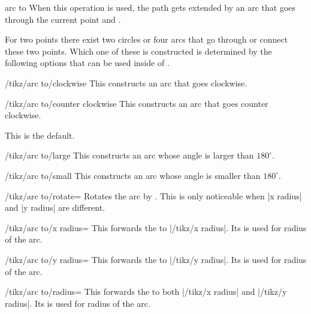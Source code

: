 \begin{pathoperation}{arc to}{}
When this operation is used, the path gets extended by an arc that goes through
the current point and .

For two points there exist two circles or four arcs that go through or connect
these two points. Which one of these is constructed is determined by the following
options that can be used inside of .

\begin{stylekey}{/tikz/arc to/clockwise}
  This constructs an arc that goes clockwise.
\end{stylekey}

\begin{stylekey}{/tikz/arc to/counter clockwise}
  This constructs an arc that goes counter clockwise.
  
  This is the default.
\end{stylekey}

\begin{stylekey}{/tikz/arc to/large}
  This constructs an arc whose angle is larger than $180^\circ$.
\end{stylekey}

\begin{stylekey}{/tikz/arc to/small}
  This constructs an arc whose angle is smaller than $180^\circ$.
\end{stylekey}

\begin{key}{/tikz/arc to/rotate=}
  Rotates the arc by .
  This is only noticeable when |x radius| and |y radius| are different.
\end{key}

\begin{key}{/tikz/arc to/x radius=}
  This forwards the  to |/tikz/x radius|.
  Its  is used for radius of the arc.
\end{key}

\begin{key}{/tikz/arc to/y radius=}
  This forwards the  to |/tikz/y radius|.
  Its  is used for radius of the arc.
\end{key}

\begin{key}{/tikz/arc to/radius=}
  This forwards the  to both |/tikz/x radius| and |/tikz/y radius|.
  Its  is used for radius of the arc.
\end{key}


\end{pathoperation}
